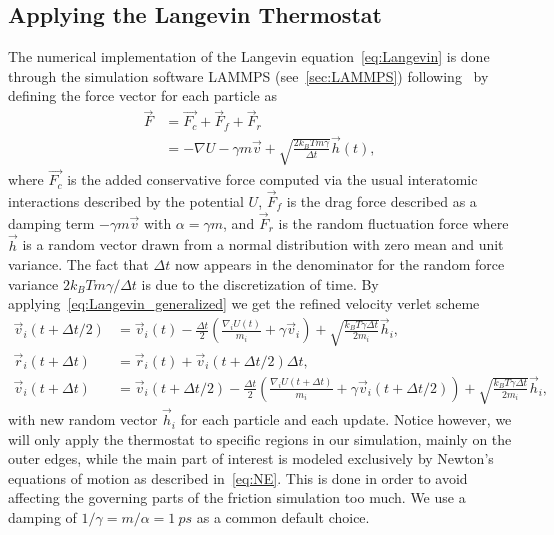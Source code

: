 \subsection{Applying the Langevin Thermostat}
The numerical implementation of the Langevin equation~\cref{eq:Langevin} is done through the simulation software LAMMPS (see~\cref{sec:LAMMPS}) following~\cite{PhysRevB.17.1302} by defining the force vector for each particle as 
\begin{align}
  \vec{F} &= \vec{F_c} + \vec{F}_{f} + \vec{F}_{r} \nonumber \\
  &= -\nabla U - \gamma m \vec{v} + \sqrt{\frac{2 k_B T m \gamma}{\Delta t}}\vec{h}(t),
  \label{eq:Langevin_generalized}
\end{align}
where $\vec{F_c}$ is the added conservative force computed via the usual
interatomic interactions described by the potential $U$, $\vec{F}_f$ is the
drag force described as a damping term $-\gamma m \vec{v}$ with $\alpha = \gamma m$, and $\vec{F}_r$ is the random fluctuation force where $\vec{h}$ is a random vector drawn from a normal distribution with zero mean and unit variance. The fact that $\Delta t$ now appears in the denominator for the random force variance $2k_B T m \gamma / \Delta t$ is due to the discretization of time. By applying~\cref{eq:Langevin_generalized} we get the refined velocity verlet scheme
\begin{align*}
  \vec{v}_i(t + \Delta t/2)  &= \vec{v}_i(t) - \frac{\Delta t}{2}\left(\frac{\nabla_i U(t)}{m_i} + \gamma \vec{v}_i \right) + \sqrt{\frac{k_B T \gamma \Delta t}{2m_i}} \vec{h}_i, \\ 
  \vec{r}_i(t + \Delta t) &= \vec{r}_i(t) + \vec{v}_i(t + \Delta t/2) \Delta t, \\
  \vec{v}_i(t + \Delta t) &= \vec{v}_i(t+ \Delta t/2) - \frac{\Delta t}{2}\left(\frac{\nabla_i U(t + \Delta t)}{m_i} + \gamma \vec{v}_i(t + \Delta t/2) \right) + \sqrt{\frac{k_B T \gamma \Delta t}{2m_i}} \vec{h}_i,
\end{align*}
with new random vector $\vec{h}_i$ for each particle and each update. Notice
however, we will only apply the thermostat to specific regions in our simulation, mainly on the outer edges, while the main part of interest is modeled exclusively by Newton's equations of motion as described in~\cref{eq:NE}. This is done in order to avoid affecting the governing parts of the friction simulation too much. We use a damping of $1/\gamma = m/\alpha = \SI{1}{ps}$ as a common default choice. 


